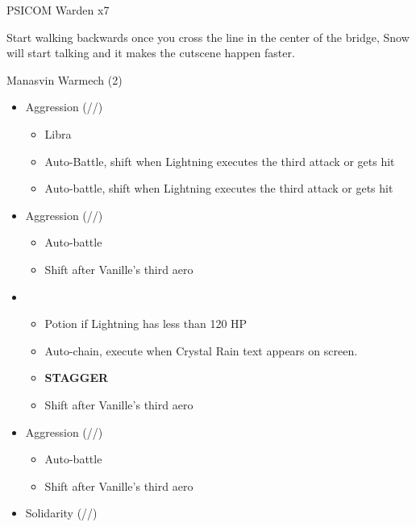 	\renewcommand{\second}{[2] Solidarity (\com/\sen/\med)}

	\renewcommand{\third}{[3] Aggression (\com/\com/\rav)}

	\renewcommand{\fourth}{[4] Aggression (\com/\com/\rav)}

	\begin{battle}[0:02]{PSICOM Warden x7}
		 
	\end{battle}
	
	Start walking backwards once you cross the line in the center of the bridge, Snow will start talking and it makes the cutscene happen faster.

	\begin{battle}[0:52]{Manasvin Warmech (2)}
		\begin{itemize}
			\item \third
			      \begin{itemize}
				      \item Libra
				      \item Auto-Battle, shift when Lightning executes the third attack or gets hit
				      \item Auto-battle, shift when Lightning executes the third attack or gets hit
			      \end{itemize}
			\item \fourth
			      \begin{itemize}
				      \item Auto-battle
				      \item Shift after Vanille's third aero
			      \end{itemize}
			\item \first
			      \begin{itemize}
				      \item Potion if Lightning has less than 120 HP
				      \item Auto-chain, execute when Crystal Rain text appears on screen.
				      \item \textbf{STAGGER}
				      \item Shift after Vanille's third aero
			      \end{itemize}
			\item \third
			      \begin{itemize}
				      \item Auto-battle
				      \item Shift after Vanille's third aero
			      \end{itemize}
			\item \second

\end{itemize}
\end{battle}
